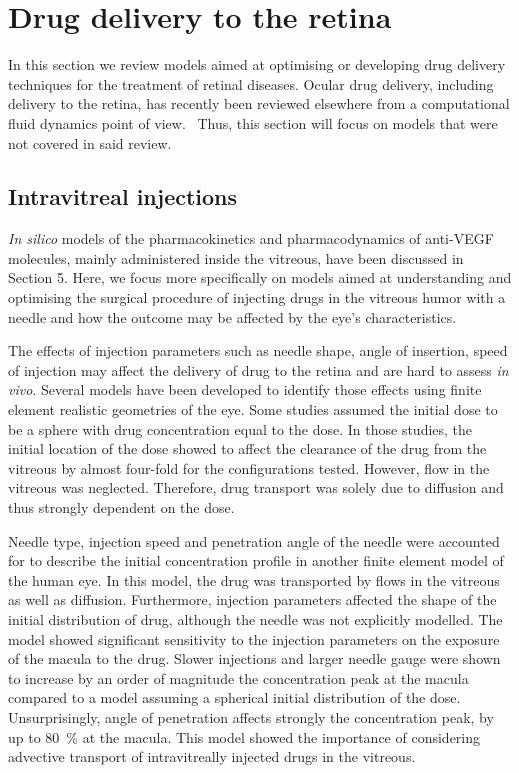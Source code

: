 \documentclass{article}
\begin{document}
\section*{Drug delivery to the retina}

In this section we review models aimed at optimising or developing drug delivery techniques for the treatment of retinal diseases.
Ocular drug delivery, including delivery to the retina, has recently been reviewed elsewhere from a computational fluid dynamics point of view.~\cite{Bhandari_2021}
Thus, this section will focus on models that were not covered in said review.

\subsection*{Intravitreal injections}

\textit{In silico} models of the pharmacokinetics and pharmacodynamics of anti-VEGF molecules, mainly administered inside the vitreous, have been discussed in Section 5.
Here, we focus more specifically on models aimed at understanding and optimising the surgical procedure of injecting drugs in the vitreous humor with a needle and how the outcome may be affected by the eye's characteristics.

The effects of injection parameters such as needle shape, angle of insertion, speed of injection may affect the delivery of drug to the retina and are hard to assess \textit{in vivo}.
Several models have been developed to identify those effects using finite element realistic geometries of the eye.
Some studies assumed the initial dose to be a sphere with drug concentration equal to the dose.\cite{Friedrich_1997,Friedrich_1997a}
In those studies, the initial location of the dose showed to affect the clearance of the drug from the vitreous by almost four-fold for the configurations tested.\cite{Friedrich_1997}
However, flow in the vitreous was neglected.
Therefore, drug transport was solely due to diffusion and thus strongly dependent on the dose.\cite{Friedrich_1997}

Needle type, injection speed and penetration angle of the needle were accounted for to describe the initial concentration profile in another finite element model of the human eye.\cite{Jooybar_2014}
In this model, the drug was transported by flows in the vitreous as well as diffusion.
Furthermore, injection parameters affected the shape of the initial distribution of drug, although the needle was not explicitly modelled.
The model showed significant sensitivity to the injection parameters on the exposure of the macula to the drug.
Slower injections and larger needle gauge were shown to increase by an order of magnitude the concentration peak at the macula compared to a model assuming a spherical initial distribution of the dose.
Unsurprisingly, angle of penetration affects strongly the concentration peak, by up to \SI{80}{\percent} at the macula.\cite{Jooybar_2014}
This model showed the importance of considering advective transport of intravitreally injected drugs in the vitreous. 
\end{document}
